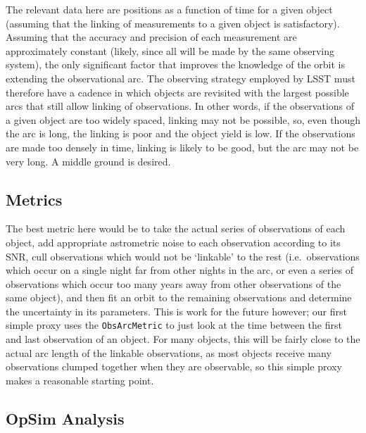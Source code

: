 The relevant data here are positions as a function of time for a given
object (assuming that the linking of measurements to a given object is
satisfactory). Assuming that the accuracy and precision of each
measurement are approximately constant (likely, since all will be made
by the same observing system), the only significant factor that improves
the knowledge of the orbit is extending the observational arc. The
observing strategy employed by LSST must therefore have a cadence in
which objects are revisited with the largest possible arcs that still
allow linking of observations. In other words, if the observations of a
given object are too widely spaced, linking may not be possible, so,
even though the arc is long, the linking is poor and the object yield is
low. If the observations are made too densely in time, linking is likely
to be good, but the arc may not be very long. A middle ground is
desired.


\subsection{Metrics}
\label{sec:\secname:metrics}

The best metric here would be to take the actual series of observations
of each object, add appropriate astrometric noise to each observation
according to its SNR, cull observations which would not be `linkable' to
the rest (i.e.\ observations which occur on a single night far from other
nights in the arc, or even a series of observations which occur too many
years away from other observations of the same object), and then fit an
orbit to the remaining observations and determine the uncertainty in its
parameters. This is work for the future however; our first simple proxy
uses the {\tt ObsArcMetric} to just look at the time between the first
and last observation of an object. For many objects, this will be fairly
close to the actual arc length of the linkable observations, as most
objects receive many observations clumped together when they are
observable, so this simple proxy makes a reasonable starting point.



\subsection{OpSim Analysis}
\label{sec:\secname:analysis}

